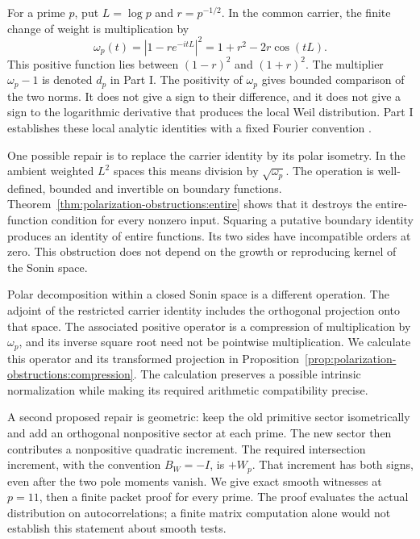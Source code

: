 \documentclass[11pt,letterpaper]{article}
\theoremstyle{definition}
\theoremstyle{remark}
\begin{document}
For a prime $p$, put $L=\log p$ and $r=p^{-1/2}$. In the common carrier,
the finite change of weight is multiplication by
\begin{equation}
 \omega_p(t)=|1-re^{-itL}|^2=1+r^2-2r\cos(tL).
 \label{eq:weight}
\end{equation}
This positive function lies between $(1-r)^2$ and $(1+r)^2$.
The multiplier $\omega_p-1$ is denoted $d_p$ in Part I.
The positivity of $\omega_p$ gives bounded comparison of the two norms. It does not
give a sign to their difference, and it does not give a sign to the
logarithmic derivative that produces the local Weil distribution.
Part I establishes these local analytic identities with a fixed Fourier
convention \cite{PartI}.

One possible repair is to replace the carrier identity by its polar
isometry. In the ambient weighted $L^2$ spaces this means division by
$\sqrt{\omega_p}$. The operation is well-defined, bounded and invertible
on boundary functions. Theorem~\ref{thm:polarization-obstructions:entire}
shows that it destroys the entire-function condition for every nonzero
input. Squaring a putative boundary identity produces an identity of
entire functions. Its two sides have incompatible orders at zero.
This obstruction does not depend on the growth or reproducing kernel
of the Sonin space.

Polar decomposition within a closed Sonin space is a different
operation. The adjoint of the restricted carrier identity includes the
orthogonal projection onto that space. The associated positive operator
is a compression of multiplication by $\omega_p$, and its inverse square
root need not be pointwise multiplication. We calculate this operator
and its transformed projection in
Proposition~\ref{prop:polarization-obstructions:compression}.
The calculation preserves a possible intrinsic normalization while
making its required arithmetic compatibility precise.

A second proposed repair is geometric: keep the old primitive sector
isometrically and add an orthogonal nonpositive sector at each prime.
The new sector then contributes a nonpositive quadratic increment.
The required intersection increment, with the convention
$B_W=-I$, is $+W_p$. That increment has both signs, even after the
two pole moments vanish. We give exact smooth witnesses at $p=11$,
then a finite packet proof for every prime. The proof evaluates the
actual distribution on autocorrelations; a finite matrix computation
alone would not establish this statement about smooth tests.
\end{document}
